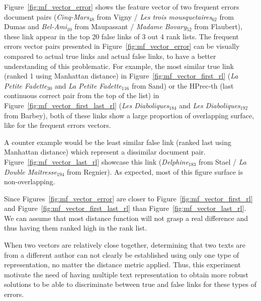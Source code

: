 Figure~\ref{fig:mf_vector_error} shows the feature vector of two frequent errors document pairs (\textit{Cinq-Mars}$_{48}$ from Vigny / \textit{Les trois mousquetaires}$_{62}$ from Dumas and \textit{Bel-Ami}$_{10}$ from Maupassant / \textit{Madame Bovary}$_{52}$ from Flaubert), these link appear in the top 20 false links of 3 out 4 rank lists.
The frequent errors vector pairs presented in Figure~\ref{fig:mf_vector_error} can be visually compared to actual true links and actual false links, to have a better understanding of this problematic.
For example, the most similar true link (ranked 1 using Manhattan distance) in Figure~\ref{fig:mf_vector_first_rl} (\textit{La Petite Fadette}$_{30}$ and \textit{La Petite Fadette}$_{116}$ from Sand) or the HPrec-th (last continuous correct pair from the top of the list) in Figure~\ref{fig:mf_vector_first_last_rl} (\textit{Les Diaboliques}$_{184}$ and \textit{Les Diaboliques}$_{192}$ from Barbey), both of these links show a large proportion of overlapping surface, like for the frequent errors vectors.

A counter example would be the least similar false link (ranked last using Manhattan distance) which represent a dissimilar document pair.
Figure~\ref{fig:mf_vector_last_rl} showcase this link (\textit{Delphine}$_{183}$ from Stael / \textit{La Double Maîtresse}$_{194}$ from Regnier).
As expected, most of this figure surface is non-overlapping.

Since Figures~\ref{fig:mf_vector_error} are closer to Figure~\ref{fig:mf_vector_first_rl} and Figure~\ref{fig:mf_vector_first_last_rl} than Figure~\ref{fig:mf_vector_last_rl}.
We can assume that most distance function will not grasp a real difference and thus having them ranked high in the rank list.

When two vectors are relatively close together, determining that two texts are from a different author can not clearly be established using only one type of representation, no matter the distance metric applied.
Thus, this experiment motivate the need of having multiple text representation to obtain more robust solutions to be able to discriminate between true and false links for these types of errors.

